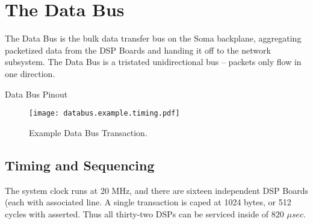 
\section{The Data Bus}

The Data Bus is the bulk data transfer bus on the Soma backplane, aggregating packetized data from the DSP Boards and handing it off to the network subsystem. The Data Bus is a tristated unidirectional bus -- packets only flow in one direction. 


\begin{SignalTable}{Data Bus Pinout}




\end{SignalTable}

\begin{figure}
\texttt{[image: databus.example.timing.pdf]}
\caption{Example Data Bus Transaction.}
\end{figure}

\subsection{Timing and Sequencing}

The system clock runs at 20 MHz, and there are sixteen independent DSP Boards (each with associated  line. A single transaction is caped at 1024 bytes, or 512 cycles with  asserted. Thus all thirty-two DSPs can be serviced inside of 820 $\mu sec$. 
